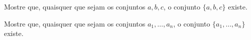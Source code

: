 \documentclass[../../../include/open-logic-section]{subfiles}
\begin{document}
\begin{prob}
Mostre que, quaisquer que sejam os conjuntos $a, b, c$, o conjunto $\{a, b, c\}$ existe.
\end{prob}

\begin{prob}
Mostre que, quaisquer que sejam os conjuntos $a_1, \ldots, a_n$, o conjunto $\{a_1, \ldots,
a_n\}$ existe.
\end{prob}

\end{document}
